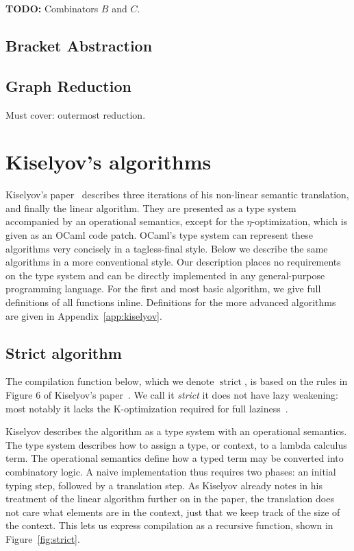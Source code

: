 \documentclass[conference]{IEEEtran}
\DeclareMathOperator{\strict}{strict}
\begin{document}
\textbf{TODO: } Combinators $B$ and $C$.

\subsection{Bracket Abstraction}

\subsection{Graph Reduction}
Must cover: outermost reduction.

\section{Kiselyov's algorithms}
\label{sec:kiselyov}
Kiselyov's paper~\cite{kiselyov_lambda_2018} describes three iterations of his non-linear semantic translation, and finally the linear algorithm.
They are presented as a type system accompanied by an operational semantics, except for the $\eta$-optimization, which is given as an OCaml code patch.
OCaml's type system can represent these algorithms very concisely in a tagless-final style.
Below we describe the same algorithms in a more conventional style.
Our description places no requirements on the type system and can be directly implemented in any general-purpose programming language.
For the first and most basic algorithm, we give full definitions of all functions inline.
Definitions for the more advanced algorithms are given in Appendix~\ref{app:kiselyov}.

\subsection{Strict algorithm}
The compilation function below, which we denote $\strict$, is based on the rules in Figure 6 of Kiselyov's paper~\cite{kiselyov_lambda_2018}.
We call it \textit{strict} it does not have lazy weakening: most notably it lacks the K-optimization required for full laziness~\cite{spj_impl}.

Kiselyov describes the algorithm as a type system with an operational semantics.
The type system describes how to assign a type, or context, to a lambda calculus term.
The operational semantics define how a typed term may be converted into combinatory logic.
A naive implementation thus requires two phases: an initial typing step, followed by a translation step.
As Kiselyov already notes in his treatment of the linear algorithm further on in the paper, the translation does not care what elements are in the context, just that we keep track of the size of the context.
This lets us express compilation as a recursive function, shown in Figure~\ref{fig:strict}.
\end{document}
